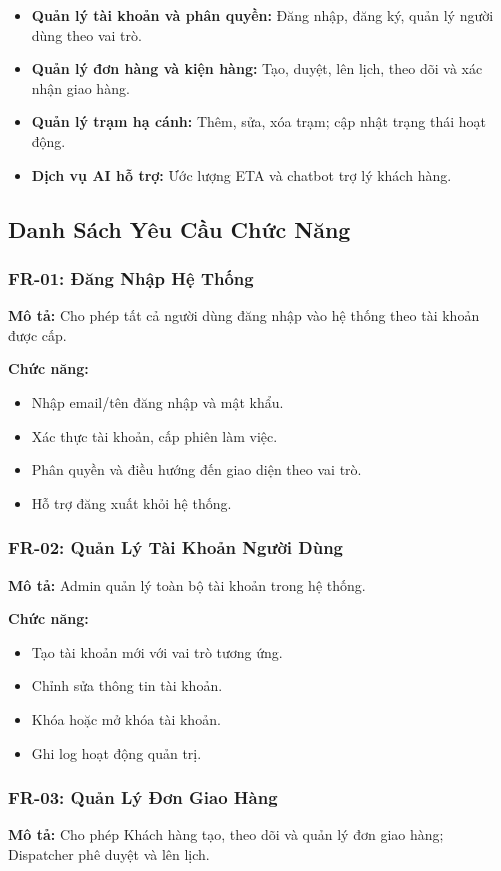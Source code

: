 \begin{itemize}
  \item \textbf{Quản lý tài khoản và phân quyền:} Đăng nhập, đăng ký, quản lý người dùng theo vai trò.
  \item \textbf{Quản lý đơn hàng và kiện hàng:} Tạo, duyệt, lên lịch, theo dõi và xác nhận giao hàng.
  \item \textbf{Quản lý trạm hạ cánh:} Thêm, sửa, xóa trạm; cập nhật trạng thái hoạt động.
  \item \textbf{Dịch vụ AI hỗ trợ:} Ước lượng ETA và chatbot trợ lý khách hàng.
\end{itemize}

\subsection{Danh Sách Yêu Cầu Chức Năng}

\subsubsection{FR-01: Đăng Nhập Hệ Thống}
\textbf{Mô tả:} Cho phép tất cả người dùng đăng nhập vào hệ thống theo tài khoản được cấp.

\textbf{Chức năng:}
\begin{itemize}
  \item Nhập email/tên đăng nhập và mật khẩu.
  \item Xác thực tài khoản, cấp phiên làm việc.
  \item Phân quyền và điều hướng đến giao diện theo vai trò.
  \item Hỗ trợ đăng xuất khỏi hệ thống.
\end{itemize}

\subsubsection{FR-02: Quản Lý Tài Khoản Người Dùng}
\textbf{Mô tả:} Admin quản lý toàn bộ tài khoản trong hệ thống.

\textbf{Chức năng:}
\begin{itemize}
  \item Tạo tài khoản mới với vai trò tương ứng.
  \item Chỉnh sửa thông tin tài khoản.
  \item Khóa hoặc mở khóa tài khoản.
  \item Ghi log hoạt động quản trị.
\end{itemize}

\subsubsection{FR-03: Quản Lý Đơn Giao Hàng}
\textbf{Mô tả:} Cho phép Khách hàng tạo, theo dõi và quản lý đơn giao hàng; Dispatcher phê duyệt và lên lịch.

